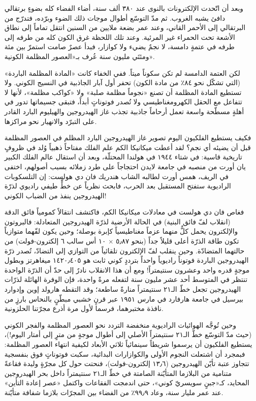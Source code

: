 \documentclass[12pt,a4paper,openany]{book}
\begin{document}
وبعد أن اتّحدت الإلكترونات بالنوى عند ٣٨٠ ألف سنة، أضاء الفضاء كله بضوءٍ برتقالي دافئ يشبه الغروب. ثم مدّ التوسّع أطوال موجات ذلك الضوء وبرّده، فتدرّج من البرتقالي إلى الأحمر القاني، وعند عمر بضعة ملايين من السنين انتقل تماماً إلى نطاق الأشعة تحت الحمراء غير المرئية. وعند تلك اللحظة غرق الكون كله من طرفه إلى طرفه في عتمةٍ دامسة، لا نجمٌ يضيء ولا كوازار، فبدأ عصرٌ صامت استمرّ بين مئة ومئتَي مليون سنة عُرف بـ«العصور المظلمة الكونية».


لكن العتمة الدامسة لم تكن سكوناً ميتاً. ففي الخفاء كانت «المادة المظلمة الباردة» (التي تشكّل نحو ٨٤٪ من مادة الكون) تحفر أول آبار الجاذبية في النسيج الكوني. ولا تستطيع المادة المظلمة أن تصنع «نجوماً مظلمة صلبة» ولا «كواكب مظلمة»، لأنها لا تتفاعل مع الحقل الكهرومغناطيسي ولا تُصدر فوتوناتٍ أبداً، فتبقى جسيماتها تدور في أهلةٍ مسطّحة واسعة تعمل أرحاماً جاذبية تجذب غاز الهيدروجين والهيليوم البارد القادر على التبرّد والانهيار نحو مراكزها.


فكيف يستطيع الفلكيون اليوم تصوير غاز الهيدروجين البارد المظلم في العصور المظلمة قبل أن يضيئه أي نجم؟ لقد أعطت ميكانيكا الكم علم الفلك مفتاحاً ذهبياً وُلد في ظروفٍ تاريخية قاسية: في شتاء ١٩٤٤ في هولندا المحتلّة، وبعد أن استقال عالم الفلك الكبير يان أورت من منصبه في جامعة لايدن احتجاجاً على طرد زملائه بسبب أصولهم، اختفى في الريف، همس أورت لطالبه الشاب هندريك فان دي هولست: إن التلسكوبات الراديوية ستفتح المستقبل بعد الحرب، فابحث نظرياً عن خطٍّ طيفي راديوي لذرّة الهيدروجين ينفذ من الضباب الكوني!


فغاص فان دي هولست في معادلات ميكانيكا الكم، فاكتشف انتقالاً كمومياً فائق الدقة (انقلاب لفّ فائق البنية) في الحالة الأرضية لذرّة الهيدروجين المتعادلة: فالبروتون والإلكترون يحمل كلٌّ منهما عزماً مغناطيسياً كإبرة بوصلة؛ وحين يكون لفّهما متوازياً تكون طاقة الذرّة أعلى قليلاً جداً (بنحو ٥٫٨٧ × ١٠ أس سالب ٦ إلكترون-فولت) من حالتهما المتضادّة. وحين ينقلب لفّ الإلكترون تلقائياً من التوازي إلى التضادّ، تُصدر ذرّة الهيدروجين الباردة فوتوناً راديوياً واحداً بترددٍ كوني ثابت هو ١٤٢٠٫٤٠٥ ميغاهرتز وبطول موجةٍ قدره واحد وعشرون سنتيمتراً! ومع أن هذا الانقلاب نادرٌ إلى حدّ أن الذرّة الواحدة تنتظر في المتوسط أحد عشر مليون سنة لتفعله مرةً واحدة، فإن الوفرة الهائلة لذرّات الهيدروجين تجعل خطّ الـ٢١ سنتيمتراً منارةً ساطعة؛ وقد التقطه هارولد إوين وإدوارد بيرسيل في جامعة هارفارد في مارس ١٩٥١ عبر قرنٍ خشبي مبطّنٍ بالنحاس بارزٍ من نافذة مختبرهما، فرسما لأول مرة أذرع مجرّتنا الحلزونية.


وحين تُوجَّه الهوائيات الراديوية منخفضة التردد نحو العصور المظلمة والفجر الكوني (حيث مدّ التوسّع خطّ الـ٢١ سنتيمتراً الأصلي إلى أطوال موجةٍ من مترٍ إلى أمتار اليوم!)، يستطيع الفلكيون أن يرسموا شريطاً سينمائياً ثلاثي الأبعاد لكيفية انتهاء العصور المظلمة: فبمجرد أن اشتعلت النجوم الأولى والكوازارات البدائية، سكبت فوتوناتٍ فوق بنفسجية تتجاوز عتبة تأيّن الهيدروجين (١٣٫٦ إلكترون-فولت)، فنحتت حول كل مجرّةٍ وليدة فقاعةً متنامية من البلازما المتأيّنة الصامتة في خطّ الـ٢١ سنتيمتراً داخل بحر الهيدروجين المحايد، كـ«جبنٍ سويسريّ كوني»، حتى اندمجت الفقاعات واكتمل «عصر إعادة التأين» عند عمر مليار سنة، وعاد ٩٩٫٩٪ من الفضاء بين المجرّات بلازما شفافة متأيّنة.
\end{document}
